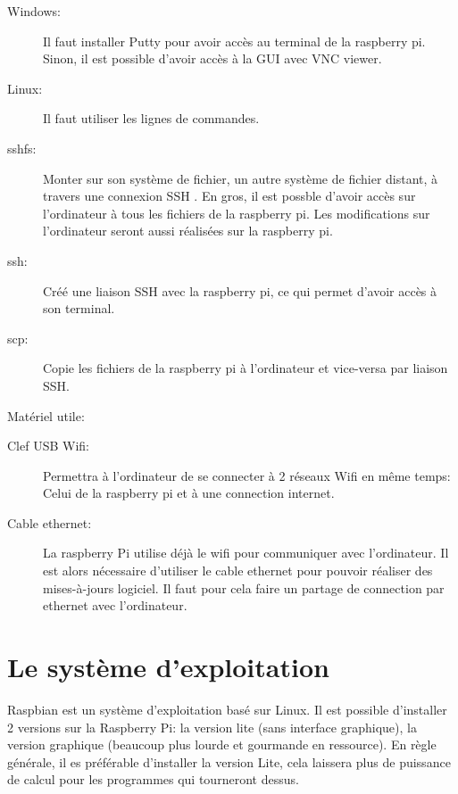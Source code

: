 \documentclass[a4paper, 11pt]{report}
\begin{document}
\begin{description}
\item[Windows:]Il faut installer Putty pour avoir accès au terminal de la raspberry pi. Sinon, il est possible d'avoir accès à la GUI avec VNC viewer.
\item[Linux:]Il faut utiliser les lignes de commandes.
\end{description}

\begin{description}
\item[sshfs:]Monter sur son système de fichier, un autre système de fichier distant, à travers une connexion SSH . En gros, il est possble d'avoir accès sur l'ordinateur à tous les fichiers de la raspberry pi. Les modifications sur l'ordinateur seront aussi réalisées sur la raspberry pi.
\item[ssh:]Créé une liaison SSH avec la raspberry pi, ce qui permet d'avoir accès à son terminal.
\item[scp:]Copie les fichiers de la raspberry pi à l'ordinateur et vice-versa par liaison SSH. 
\end{description}

Matériel utile:
\begin{description}
\item[Clef USB Wifi:]Permettra à l'ordinateur de se connecter à 2 réseaux Wifi en même temps: Celui de la raspberry pi et à une connection internet.
\item[Cable ethernet:]La raspberry Pi utilise déjà le wifi pour communiquer avec l'ordinateur. Il est alors nécessaire d'utiliser le cable ethernet pour pouvoir réaliser des mises-à-jours logiciel. Il faut pour cela faire un partage de connection par ethernet avec l'ordinateur.
\end{description}


\section{Le système d'exploitation}
Raspbian est un système d'exploitation basé sur Linux. Il est possible d'installer 2 versions sur la Raspberry Pi: la version lite (sans interface graphique), la version graphique (beaucoup plus lourde et gourmande en ressource). En règle générale, il es préférable d'installer la version Lite, cela laissera plus de puissance de calcul pour les programmes qui tourneront dessus.
\end{document}
